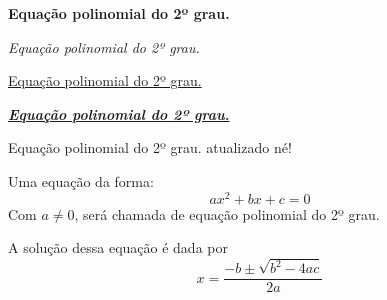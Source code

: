 \documentclass[a4paper, 12pt]{article}
\begin{document}
\begin{center}
\textbf{Equação polinomial do 2º grau.}
\end{center}

\begin{flushright}
\textit{Equação polinomial do 2º grau.}
\end{flushright}

\begin{flushleft}
\underline{Equação polinomial do 2º grau.}
\end{flushleft}

\begin{flushleft}
\textbf{\textit{\underline{Equação polinomial do 2º grau.}}}
\end{flushleft}

Equação polinomial do 2º grau. atualizado né!

Uma equação da forma: $$ax^2 + bx +c = 0$$ Com $a \neq 0$, será chamada de equação
polinomial do 2º grau. 

A solução dessa equação é dada por
$$x = \frac{-b \pm \sqrt{b^2 - 4ac}} {2a}$$
\end{document}

